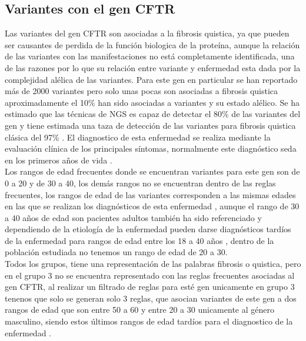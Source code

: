\subsection{Variantes con el gen CFTR}

Las variantes del gen CFTR son asociadas a la fibrosis quistica, ya que pueden ser causantes de perdida de la función biologica de la proteína, aunque la relación de las variantes con las manifestaciones no está completamente identificada, una de las razones por lo que su relación entre variante y enfermedad esta dada por la complejidad alélica de las variantes. Para este gen en particular se han reportado más de 2000 variantes pero solo unas pocas son asociadas a fibrosis quistica aproximadamente el 10\% han sido asociadas a variantes y su estado alélico. Se ha estimado que las técnicas de NGS es capaz de detectar el 80\% de las variantes del gen y tiene estimada una taza de detección de las variantes para fibrosis quistica clásica del 97\% \cite{Rowntree2003,Terlizzi2017b,Farrell2016}. El diagnostico de esta enfermedad se realiza mediante la evaluación clínica de los principales síntomas, normalmente este diagnóstico seda en los primeros años de vida \cite{Terlizzi2017b}.\\

Los rangos de edad frecuentes donde se encuentran variantes para este gen son de 0 a 20 y de 30 a 40, los demás rangos no se encuentran dentro de las reglas frecuentes, los rangos de edad de las variantes corresponden a las mismas edades en las que se realizan los diagnósticos de esta enfermedad \cite{Terlizzi2017b}, aunque el rango de 30 a 40 años de edad son pacientes adultos también ha sido referenciado y dependiendo de la etiología de la enfermedad pueden darse diagnósticos tardíos de la enfermedad para rangos de edad entre los 18 a 40 años \cite{Farrell2008}, dentro de la población estudiada no tenemos un rango de edad de 20 a 30. \\

Todos los grupos, tiene una representación de las palabras fibrosis o quistica, pero en el grupo 3 no se encuentra representado con las reglas frecuentes asociadas al gen CFTR, al realizar un filtrado de reglas para esté gen unicamente en grupo 3 tenenos que solo se generan solo 3 reglas, que asocian variantes de este gen a dos rangos de edad que son entre 50 a 60 y entre 20 a 30 unicamente al género masculino, siendo estos últimos rangos de edad tardíos para el diagnostico de la enfermedad \cite{Farrell2008}.\\

